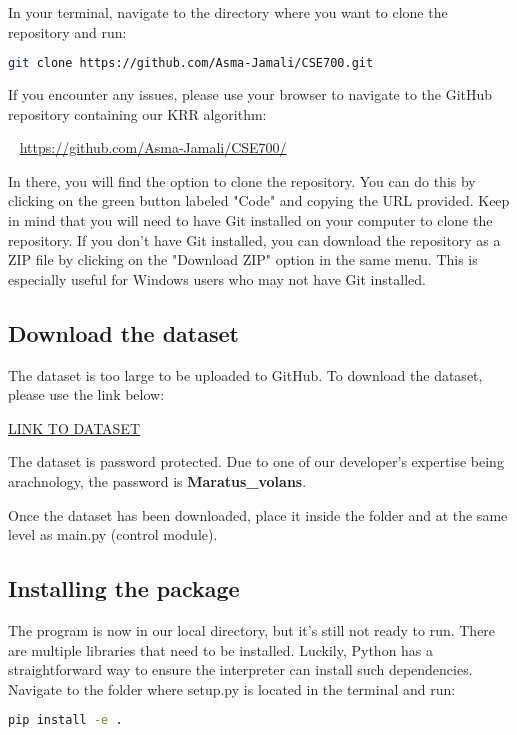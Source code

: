 \documentclass{article}
\begin{document}
In your terminal, navigate to the directory where you want to clone the repository and run:

\begin{lstlisting}[language=bash]
    git clone https://github.com/Asma-Jamali/CSE700.git
\end{lstlisting}

If you encounter any issues, please use your browser to navigate to the GitHub repository containing our KRR algorithm:

~\newline
\href{https://github.com/Asma-Jamali/CSE700/}{https://github.com/Asma-Jamali/CSE700/}
~\newline 

In there, you will find the option to clone the repository. You can do this by clicking on the green button labeled "Code" and copying the URL provided.
Keep in mind that you will need to have Git installed on your computer to clone the repository.
If you don't have Git installed, you can download the repository as a ZIP file by clicking on the "Download ZIP" option in the same menu.
This is especially useful for Windows users who may not have Git installed.

\subsection{Download the dataset}
The dataset is too large to be uploaded to GitHub. To download the dataset, please use the link below:

\href{https://mcmasteru365-my.sharepoint.com/:f:/g/personal/garcilau_mcmaster_ca/El34gk2N9_lPkw9xiCZU5_kBwu6Xg1YPbDJVekdcor7IkQ?e=3Uvl8c}{LINK TO DATASET}

The dataset is password protected. Due to one of our developer's expertise being arachnology, the password is \textbf{Maratus\_volans}.

Once the dataset has been downloaded, place it inside the folder and at the same level as main.py (control module).

\subsection{Installing the package}

The program is now in our local directory, but it's still not ready to run. There are multiple libraries 
that need to be installed. Luckily, Python has a straightforward way to ensure the interpreter can install such dependencies.
Navigate to the folder where setup.py is located in the terminal and run:
\begin{lstlisting}[language=bash]
    pip install -e .
\end{lstlisting}
\end{document}
